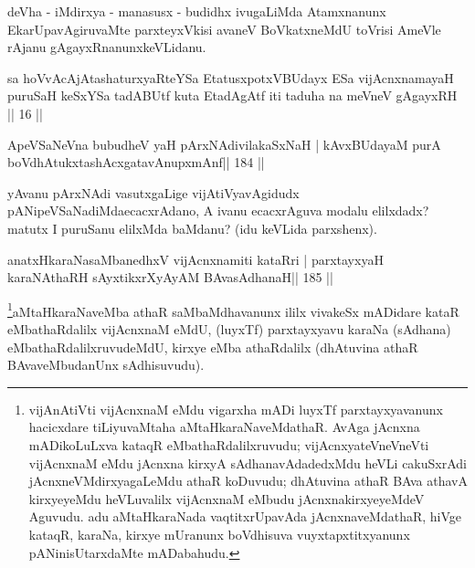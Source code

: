 \begin{artha}
deVha - iMdirxya - manasusx - budidhx ivugaLiMda Atamxnanunx EkarUpavAgiruvaMte parxteyxVkisi avaneV BoVkatxneMdU toVrisi AmeVle rAjanu gAgayxRnanunx\break keVLidanu.
\end{artha}



\begin{kandikeshl}
sa hoVvAcAjAtashaturxyaRteYSa EtatusxpotxV\s BUdayx 
ESa vijAcnxnamayaH puruSaH keSxYSa tadABUtf
kuta EtadAgAtf iti taduha na meVneV gAgayxRH || 16 ||
\end{kandikeshl}

\begin{shl}
ApeVSaNeVna bubudheV yaH pArxNAdivilakaSxNaH |
kAvxBUdayaM purA boVdhAtukxtashAcx\s\s gatavAnupxmAnf\hfill || 184 ||
\end{shl}

\begin{artha}
yAvanu pArxNAdi vasutxgaLige vijAtiVyavAgidudx pANipeVSaNadiMda\break ecacxrAdano, A ivanu ecacxrAguva modalu elilxdadx? matutx I puruSanu elilxMda baMdanu? (idu keVLida parxshenx).
\end{artha}


\begin{shl}
anatxHkaraNasaMbanedhxV vijAcnxnamiti kataRri |
parxtayxyaH karaNAthaRH sAyxtikxrXyAyAM BAvasAdhanaH\hfill || 185 ||
\end{shl}

\begin{artha}
\footnote{vijAnAtiVti vijAcnxnaM eMdu vigarxha mADi luyxTf  parxtayxyavanunx hacicxdare tiLiyuvaMtaha aMtaHkaraNaveMdathaR. AvAga  jAcnxna mADikoLuLxva kataqR eMbathaRdalilxruvudu; vijAcnxyateV\s  \-neVneVti vijAcnxnaM eMdu jAcnxna kirxyA sAdhanavAdadedxMdu heVLi cakuSxrAdi jAcnxneVMdirxyagaLeMdu athaR koDuvudu; dhAtuvina athaR BAva athavA kirxyeyeMdu heVLuvalilx vijAcnxnaM eMbudu jAcnxnakirxyeyeMdeV Aguvudu. adu aMtaHkaraNada vaqtitxrUpavAda jAcnxnaveMdathaR, hiVge kataqR, karaNa, kirxye mUranunx boVdhisuva vuyxtapxtitxyanunx pANinisUtarxdaMte mADabahudu.}aMtaHkaraNaveMba athaR saMbaMdhavanunx ililx vivakeSx mADidare kataR eMbathaRdalilx vijAcnxnaM eMdU, (luyxTf) parxtayxyavu karaNa (sAdhana) eMbathaRdalilxruvudeMdU, kirxye eMba athaRdalilx (dhAtuvina athaR BAvaveMbudanUnx sAdhisuvudu).
\end{artha}

